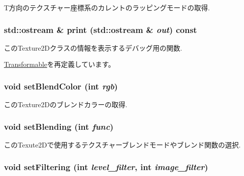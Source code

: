 T方向のテクスチャー座標系のカレントのラッピングモードの取得. \hypertarget{classm3g_1_1Texture2D_6fea17fa1532df3794f8cb39cb4f911f}{
\subsubsection[{print}]{\setlength{\rightskip}{0pt plus 5cm}std::ostream \& print (std::ostream \& {\em out}) const}}
\label{classm3g_1_1Texture2D_6fea17fa1532df3794f8cb39cb4f911f}


このTexture2Dクラスの情報を表示するデバッグ用の関数. 

\hyperlink{classm3g_1_1Transformable_6fea17fa1532df3794f8cb39cb4f911f}{Transformable}を再定義しています。\hypertarget{classm3g_1_1Texture2D_b5a6333203f443fb1f66ea2e39d4de1b}{
\subsubsection[{setBlendColor}]{\setlength{\rightskip}{0pt plus 5cm}void setBlendColor (int {\em rgb})}}
\label{classm3g_1_1Texture2D_b5a6333203f443fb1f66ea2e39d4de1b}


このTexture2Dのブレンドカラーの取得. \hypertarget{classm3g_1_1Texture2D_189d98ce3e8ac7590be771944b3186d4}{
\subsubsection[{setBlending}]{\setlength{\rightskip}{0pt plus 5cm}void setBlending (int {\em func})}}
\label{classm3g_1_1Texture2D_189d98ce3e8ac7590be771944b3186d4}


このTexute2Dで使用するテクスチャーブレンドモードやブレンド関数の選択. \hypertarget{classm3g_1_1Texture2D_857574b5c0f3e0ca9239bafb4008cae1}{
\subsubsection[{setFiltering}]{\setlength{\rightskip}{0pt plus 5cm}void setFiltering (int {\em level\_\-filter}, \/  int {\em image\_\-filter})}}
\label{classm3g_1_1Texture2D_857574b5c0f3e0ca9239bafb4008cae1}


